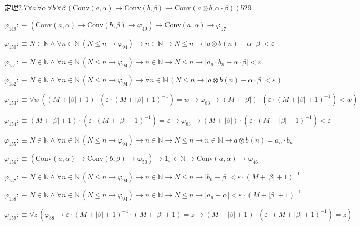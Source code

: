 \begin{fullproof}{定理2.7}{$\forall a\,\forall \alpha\,\forall b\,\forall \beta\,(\mathrm{Conv}(a,\alpha) \to \mathrm{Conv}(b,\beta) \to \mathrm{Conv}(a \otimes b,\alpha \cdot \beta))$}{529}
\begin{abbrevlist}
\item $\varphi_{149} :\equiv (\mathrm{Conv}(a,\alpha) \to \mathrm{Conv}(b,\beta) \to \varphi_{49}) \to \mathrm{Conv}(a,\alpha) \to \varphi_{57}$
\item $\varphi_{150} :\equiv N \in \mathbb{N} \land \forall n \in \mathbb{N}\,(N \leq n \to \varphi_{94}) \to n \in \mathbb{N} \to N \leq n \to \lvert a \otimes b(n) - \alpha \cdot \beta \rvert < \varepsilon$
\item $\varphi_{151} :\equiv N \in \mathbb{N} \land \forall n \in \mathbb{N}\,(N \leq n \to \varphi_{94}) \to n \in \mathbb{N} \to N \leq n \to \lvert a_{n} \cdot b_{n} - \alpha \cdot \beta \rvert < \varepsilon$
\item $\varphi_{152} :\equiv N \in \mathbb{N} \land \forall n \in \mathbb{N}\,(N \leq n \to \varphi_{94}) \to \forall n \in \mathbb{N}\,(N \leq n \to \lvert a \otimes b(n) - \alpha \cdot \beta \rvert < \varepsilon)$
\item $\varphi_{153} :\equiv \forall w\,((M + \lvert \beta \rvert + 1) \cdot (\varepsilon \cdot (M + \lvert \beta \rvert + 1)^{-1}) = w \to \varphi_{83} \to (M + \lvert \beta \rvert) \cdot (\varepsilon \cdot (M + \lvert \beta \rvert + 1)^{-1}) < w)$
\item $\varphi_{154} :\equiv (M + \lvert \beta \rvert + 1) \cdot (\varepsilon \cdot (M + \lvert \beta \rvert + 1)^{-1}) = \varepsilon \to \varphi_{83} \to (M + \lvert \beta \rvert) \cdot (\varepsilon \cdot (M + \lvert \beta \rvert + 1)^{-1}) < \varepsilon$
\item $\varphi_{155} :\equiv N \in \mathbb{N} \land \forall n \in \mathbb{N}\,(N \leq n \to \varphi_{94}) \to n \in \mathbb{N} \to N \leq n \to n \in \mathbb{N} \to a \otimes b(n) = a_{n} \cdot b_{n}$
\item $\varphi_{156} :\equiv (\mathrm{Conv}(a,\alpha) \to \mathrm{Conv}(b,\beta) \to \varphi_{50}) \to 1_{\omega} \in \mathbb{N} \to \mathrm{Conv}(a,\alpha) \to \varphi_{46}$
\item $\varphi_{157} :\equiv N \in \mathbb{N} \land \forall n \in \mathbb{N}\,(N \leq n \to \varphi_{94}) \to n \in \mathbb{N} \to N \leq n \to \lvert b_{n} - \beta \rvert < \varepsilon \cdot (M + \lvert \beta \rvert + 1)^{-1}$
\item $\varphi_{158} :\equiv N \in \mathbb{N} \land \forall n \in \mathbb{N}\,(N \leq n \to \varphi_{94}) \to n \in \mathbb{N} \to N \leq n \to \lvert a_{n} - \alpha \rvert < \varepsilon \cdot (M + \lvert \beta \rvert + 1)^{-1}$
\item $\varphi_{159} :\equiv \forall z\,(\varphi_{88} \to \varepsilon \cdot (M + \lvert \beta \rvert + 1)^{-1} \cdot (M + \lvert \beta \rvert + 1) = z \to (M + \lvert \beta \rvert + 1) \cdot (\varepsilon \cdot (M + \lvert \beta \rvert + 1)^{-1}) = z)$

\end{abbrevlist}
\end{fullproof}
